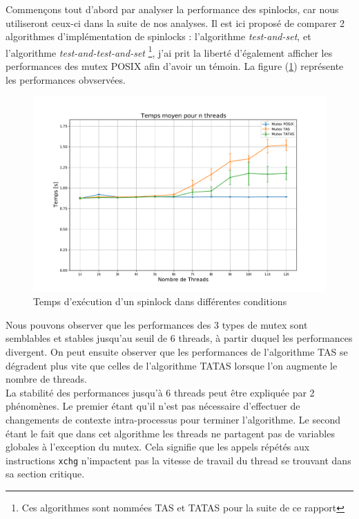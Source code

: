 Commençons tout d'abord par analyser la performance des spinlocks, car nous utiliseront ceux-ci dans la suite de nos analyses. Il est ici proposé de comparer
2 algorithmes d'implémentation de spinlocks : l'algorithme \textit{test-and-set}, et l'algorithme \textit{test-and-test-and-set} \footnote{Ces algorithmes sont nommées TAS et TATAS pour la suite de ce rapport}, j'ai prit la liberté d'également afficher les performances des mutex POSIX afin d'avoir un témoin. La figure (\ref{pic:spinlock}) représente les performances obvservées.\\

\begin{figure}[h]
    \centering
    \includegraphics[scale=0.4]{img/spinlock.pdf}
    \caption{Temps d'exécution d'un spinlock dans différentes conditions}
    \label{pic:spinlock}
\end{figure}

\noindent Nous pouvons observer que les performances des 3 types de mutex sont semblables et stables jusqu'au seuil de 6 threads, à partir duquel les performances divergent.
On peut ensuite observer que les performances de l'algorithme TAS se dégradent plus vite que celles de l'algorithme TATAS lorsque l'on augmente le nombre de threads. \\

\noindent La stabilité des performances jusqu'à 6 threads peut être expliquée par 2 phénomènes. Le premier étant qu'il n'est pas nécessaire d'effectuer de changements de contexte intra-processus pour terminer l'algorithme. Le second étant le fait que dans cet algorithme les threads ne partagent pas de variables globales à l'exception du mutex. Cela signifie que les appels répétés aux instructions \texttt{xchg} n'impactent pas la vitesse de travail du thread se trouvant dans sa section critique.\\[0.1cm]


